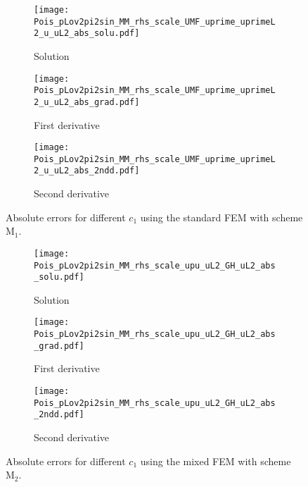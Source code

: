 \documentclass[final,3p]{elsarticle}
\begin{document}
\begin{figure}[!ht]
    \begin{subfigure}{5.5cm}
        \texttt{[image: Pois\_pLov2pi2sin\_MM\_rhs\_scale\_UMF\_uprime\_uprimeL2\_u\_uL2\_abs\_solu.pdf]}
        \caption{Solution}
        \label{Fig:Pois_pLov2pi2sin_MM_rhs_scale_UMF_uprime_uprimeL2_u_uL2_abs_solu}
    \end{subfigure}
    \begin{subfigure}{5.5cm}
        \texttt{[image: Pois\_pLov2pi2sin\_MM\_rhs\_scale\_UMF\_uprime\_uprimeL2\_u\_uL2\_abs\_grad.pdf]}
        \caption{First derivative}
        \label{Fig:Pois_pLov2pi2sin_MM_rhs_scale_UMF_uprime_uprimeL2_u_uL2_abs_grad}
    \end{subfigure}
    \begin{subfigure}{5.5cm}
        \texttt{[image: Pois\_pLov2pi2sin\_MM\_rhs\_scale\_UMF\_uprime\_uprimeL2\_u\_uL2\_abs\_2ndd.pdf]}
        \caption{Second derivative}
        \label{Fig:Pois_pLov2pi2sin_MM_rhs_scale_UMF_uprime_uprimeL2_u_uL2_abs_2ndd}
    \end{subfigure}
\caption{Absolute errors for different $c_1$ using the standard FEM with scheme $\text{M}_1$.}    
\label{Pois_pLov2pi2sin_MM_rhs M1}
\end{figure}

\begin{figure}[!ht]
    \begin{subfigure}{5.5cm}
        \texttt{[image: Pois\_pLov2pi2sin\_MM\_rhs\_scale\_upu\_uL2\_GH\_uL2\_abs\_solu.pdf]}
        \caption{Solution}
        \label{Fig:Pois_pLov2pi2sin_MM_rhs_scale_upu_uL2_GH_uL2_abs_solu}
    \end{subfigure}
    \begin{subfigure}{5.5cm}
        \texttt{[image: Pois\_pLov2pi2sin\_MM\_rhs\_scale\_upu\_uL2\_GH\_uL2\_abs\_grad.pdf]}
        \caption{First derivative}
        \label{Fig:Pois_pLov2pi2sin_MM_rhs_scale_upu_uL2_GH_uL2_abs_grad}
    \end{subfigure}
    \begin{subfigure}{5.5cm}
        \texttt{[image: Pois\_pLov2pi2sin\_MM\_rhs\_scale\_upu\_uL2\_GH\_uL2\_abs\_2ndd.pdf]}
        \caption{Second derivative}
        \label{Fig:Pois_pLov2pi2sin_MM_rhs_scale_upu_uL2_GH_uL2_abs_2ndd}
    \end{subfigure}
\caption{Absolute errors for different $c_1$ using the mixed FEM with scheme $\text{M}_2$.}
\label{Pois_pLov2pi2sin_MM_rhs M2}
\end{figure}
\end{document}
